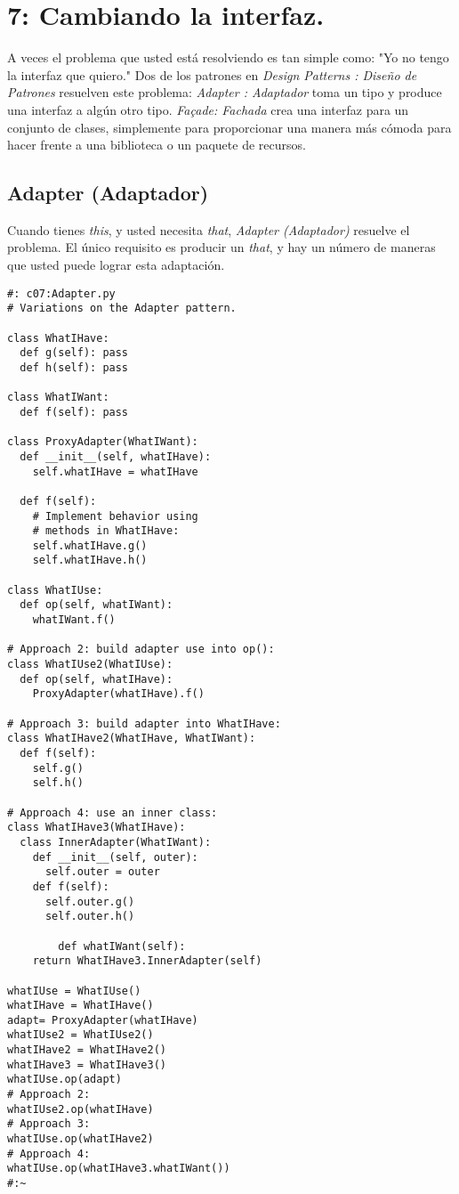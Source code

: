 \section*{7: Cambiando la interfaz.}
\label{sec:cli}


A veces el problema que usted está resolviendo es tan simple como: "Yo no tengo la interfaz que quiero." Dos de los patrones en \textit{Design Patterns : Diseño de Patrones} resuelven este problema: \textit{Adapter : Adaptador} toma un tipo y produce una interfaz a algún otro tipo.  \textit{Façade: Fachada} crea una interfaz para un conjunto de clases, simplemente para proporcionar una manera más cómoda para hacer frente a una biblioteca o un paquete de recursos.


\subsection*{Adapter (Adaptador)}
\label{subsec:Adapter}


Cuando tienes \textit{this}, y usted necesita \textit{that}, \textit{Adapter (Adaptador)} resuelve el problema. El único requisito es producir un \textit{that},  y hay un número de maneras que usted puede lograr esta adaptación.

\begin{lstlisting} 
#: c07:Adapter.py 
# Variations on the Adapter pattern.

class WhatIHave: 
  def g(self): pass 
  def h(self): pass 
  
class WhatIWant: 
  def f(self): pass 
  
class ProxyAdapter(WhatIWant): 
  def __init__(self, whatIHave): 
    self.whatIHave = whatIHave 
    
  def f(self): 
    # Implement behavior using  
    # methods in WhatIHave: 
    self.whatIHave.g() 
    self.whatIHave.h() 
    
class WhatIUse: 
  def op(self, whatIWant): 
    whatIWant.f() 
    
# Approach 2: build adapter use into op(): 
class WhatIUse2(WhatIUse): 
  def op(self, whatIHave): 
    ProxyAdapter(whatIHave).f() 
    
# Approach 3: build adapter into WhatIHave: 
class WhatIHave2(WhatIHave, WhatIWant): 
  def f(self): 
    self.g() 
    self.h() 
    
# Approach 4: use an inner class: 
class WhatIHave3(WhatIHave): 
  class InnerAdapter(WhatIWant): 
    def __init__(self, outer): 
      self.outer = outer 
    def f(self): 
      self.outer.g() 
      self.outer.h() 
      
        def whatIWant(self):  
    return WhatIHave3.InnerAdapter(self) 
    
whatIUse = WhatIUse() 
whatIHave = WhatIHave() 
adapt= ProxyAdapter(whatIHave) 
whatIUse2 = WhatIUse2() 
whatIHave2 = WhatIHave2() 
whatIHave3 = WhatIHave3() 
whatIUse.op(adapt) 
# Approach 2: 
whatIUse2.op(whatIHave) 
# Approach 3: 
whatIUse.op(whatIHave2) 
# Approach 4: 
whatIUse.op(whatIHave3.whatIWant()) 
#:~ 
\end{lstlisting}

